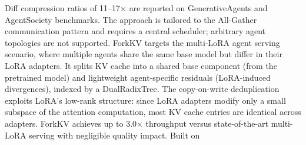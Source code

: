 \documentclass[preprint,12pt]{elsarticle}
\begin{document}
Diff compression ratios of 11--17$\times$ are reported on GenerativeAgents and AgentSociety benchmarks. The approach is tailored to the All-Gather communication pattern and requires a central scheduler; arbitrary agent topologies are not supported. ForkKV \cite{v5ref36} targets the multi-LoRA agent serving scenario, where multiple agents share the same base model but differ in their LoRA adapters. It splits KV cache into a shared base component (from the pretrained model) and lightweight agent-specific residuals (LoRA-induced divergences), indexed by a DualRadixTree. The copy-on-write deduplication exploits LoRA's low-rank structure: since LoRA adapters modify only a small subspace of the attention computation, most KV cache entries are identical across adapters. ForkKV achieves up to 3.0$\times$ throughput versus state-of-the-art multi-LoRA serving with negligible quality impact. Built on
\end{document}
